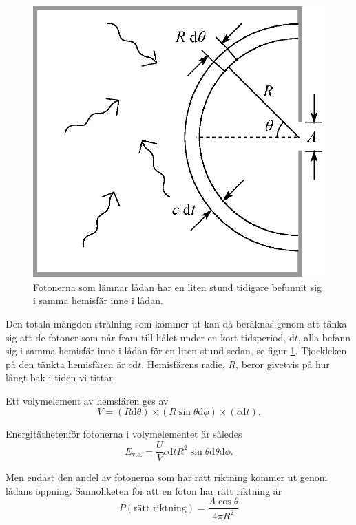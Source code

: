 \begin{figure}[hpbt]
\centering
\includegraphics[height=0.3\textheight]{images/blackbody_box.eps}
\caption{\label{fig:box}{Fotonerna som lämnar lådan har en liten stund tidigare befunnit sig i samma hemisfär inne i lådan.}}
\end{figure}

Den totala mängden strålning som kommer ut kan då beräknas genom att tänka sig att de fotoner som når fram till hålet under en kort tidsperiod, $\mathrm{d}t$, alla befann sig i samma hemisfär inne i lådan för en liten stund sedan, se figur \ref{fig:box}. Tjockleken på den tänkta hemisfären är $c\mathrm{d}t$. Hemisfärens radie, $R$, beror givetvis på hur långt bak i tiden vi tittar.

Ett volymelement av hemsfären ges av
\begin{equation}
V=(R\mathrm{d}\theta) \times (R\sin\theta\mathrm{d}\phi) \times (c \mathrm{d}t).
\end{equation}

Energitäthetenför fotonerna i volymelementet är således
\begin{equation}
E_\text{v.e.}=\frac{U}{V} c \mathrm{d}t R^2 \sin\theta \mathrm{d}\theta \mathrm{d}\phi.
\end{equation}

Men endast den andel av fotonerna som har rätt riktning kommer ut genom lådans öppning. Sannoliketen för att en foton har rätt riktning är
\begin{equation}
P(\text{rätt riktning})=\frac{A\cos\theta}{4\pi R^2}
\end{equation}

